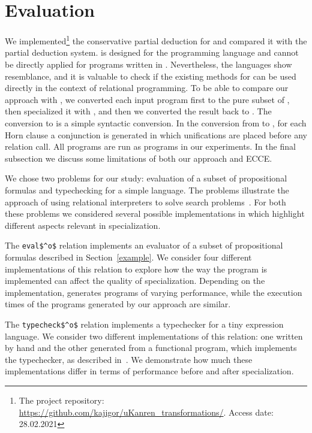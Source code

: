 \section{Evaluation}
\label{evaluation}

We implemented\footnote{The project repository: \url{https://github.com/kajigor/uKanren_transformations/}. Access date: 28.02.2021} the conservative partial deduction for \mk and compared it with the \ecce partial deduction system.
\ecce is designed for the \pro programming language and cannot be directly applied for programs written in \mk.
Nevertheless, the languages show resemblance, and it is valuable to check if the existing methods for \pro can be used directly in the context of relational programming.
To be able to compare our approach with \ecce, we converted each input program first to the pure subset of \pro, then specialized it with \ecce, and then we converted the result back to \mk.
The conversion to \pro is a simple syntactic conversion. In the conversion from \pro to \mk, for each Horn clause a conjunction is generated in which unifications are placed before any relation call.
All programs are run as \mk programs in our experiments.
In the final subsection we discuss some limitations of both our approach and ECCE.

We chose two problems for our study: evaluation of a subset of propositional formulas and typechecking for a simple language.
The problems illustrate the approach of using relational interpreters to solve search problems~\cite{lozov2019relational}.
For both these problems we considered several possible implementations in \mk which highlight different aspects relevant in specialization.

The \lstinline{eval$^o$} relation implements an evaluator of a subset of propositional formulas described in Section~\ref{example}.
We consider four different implementations of this relation to explore how the way the program is implemented can affect the quality of specialization.
Depending on the implementation, \ecce generates programs of varying performance, while the execution times of the programs generated by our approach are similar.

The \lstinline{typecheck$^o$} relation implements a typechecker for a tiny expression language.
We consider two different implementations of this relation: one written by hand and the other generated from a functional program, which implements the typechecker, as described in~\cite{lozov2019relational}.
We demonstrate how much these implementations differ in terms of performance before and after specialization.

